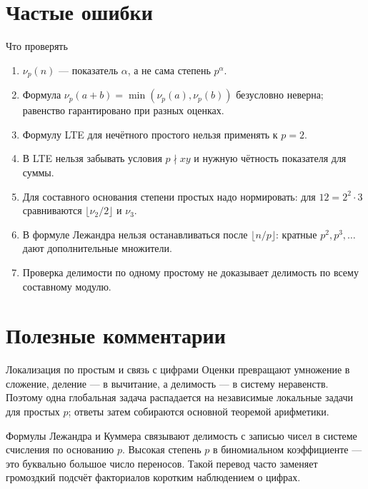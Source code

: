 \section{Частые ошибки}

\begin{warningbox}{Что проверять}
\begin{enumerate}
  \item $\nu_p(n)$ --- показатель $\alpha$, а не сама степень $p^\alpha$.
  \item Формула
        $\nu_p(a+b)=\min(\nu_p(a),\nu_p(b))$ безусловно неверна;
        равенство гарантировано при разных оценках.
  \item Формулу LTE для нечётного простого нельзя применять к $p=2$.
  \item В LTE нельзя забывать условия $p\nmid xy$ и нужную чётность
        показателя для суммы.
  \item Для составного основания степени простых надо нормировать:
        для $12=2^2\cdot3$ сравниваются $\lfloor\nu_2/2\rfloor$ и
        $\nu_3$.
  \item В формуле Лежандра нельзя останавливаться после
        $\lfloor n/p\rfloor$: кратные $p^2,p^3,\ldots$ дают
        дополнительные множители.
  \item Проверка делимости по одному простому не доказывает делимость
        по всему составному модулю.
\end{enumerate}
\end{warningbox}

\section{Полезные комментарии}

\begin{commentbox}{Локализация по простым и связь с цифрами}
Оценки превращают умножение в сложение, деление --- в вычитание, а
делимость --- в систему неравенств. Поэтому одна глобальная задача
распадается на независимые локальные задачи для простых $p$; ответы
затем собираются основной теоремой арифметики.

Формулы Лежандра и Куммера связывают делимость с записью чисел в
системе счисления по основанию $p$. Высокая степень $p$ в биномиальном
коэффициенте --- это буквально большое число переносов. Такой перевод
часто заменяет громоздкий подсчёт факториалов коротким наблюдением о
цифрах.
\end{commentbox}

